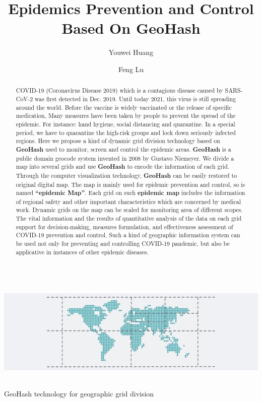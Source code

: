 \documentclass[sigplan,screen]{acmart}
\begin{document}
\title{Epidemics Prevention and Control Based On GeoHash}
\author{Youwei Huang}
\author{Feng Lu}
\begin{abstract}
	COVID-19 (Coronavirus Disease 2019) which is a contagious disease caused by SARS-CoV-2\cite{hu2020characteristics} was first detected in Dec. 2019.
	Until today 2021, this virus is still spreading around the world. Before the vaccine is widely vaccinated or the release of specific medication, Many measures have been taken by people to prevent the spread of the epidemic. For instance: hand hygiene, social distancing and quarantine.
	In a special period, we have to quarantine the high-risk groups and lock down seriously infected regions.
	Here we propose a kind of dynamic grid division technology based on \textbf{GeoHash} used to monitor, screen and control the epidemic areas.
	\textbf{GeoHash} is a public domain geocode system invented in 2008 by Gustavo Niemeyer\cite{niemeyer2008geohash}.
	We divide a map into several grids and use \textbf{GeoHash} to encode the information of each grid.
	Through the computer visualization technology, \textbf{GeoHash} can be easily restored to original digital map.
	The map is mainly used for epidemic prevention and control, so is named \textbf{``epidemic Map''}.
	Each grid on such \textbf{epidemic map} includes the information of regional safety and other important characteristics which are concerned by medical work.
	Dynamic grids on the map can be scaled for monitoring area of different scopes.
	The vital information and the results of quantitative analysis of the data on each grid support for decision-making, measures formulation, and effectiveness assessment of COVID-19 prevention and control.
	Such a kind of geographic information system can be used not only for preventing and controlling COVID-19 pandemic, but also be applicative in instances of other epidemic diseases.
\end{abstract}
\begin{teaserfigure}
	\centering\includegraphics[height=50mm]{logo.png}
	\caption{GeoHash technology for geographic grid division}
	\label{fig:teaser}
\end{teaserfigure}
\end{document}
